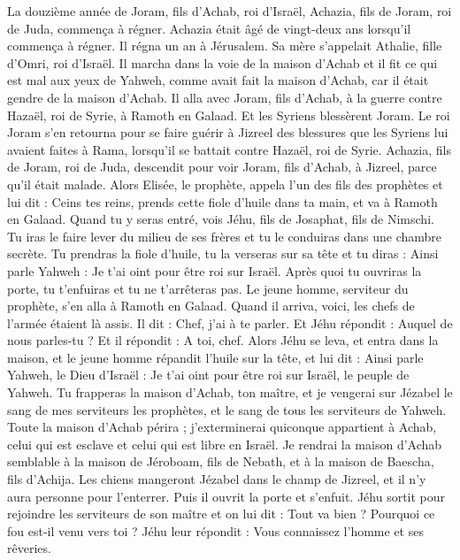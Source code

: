 \begin{multicols}{2}
La douzième année de Joram, fils d'Achab, roi d'Israël, Achazia, fils de Joram, roi de Juda, commença à régner.
Achazia était âgé de vingt-deux ans lorsqu'il commença à régner. Il régna un an à Jérusalem. Sa mère s'appelait Athalie, fille d'Omri, roi d'Israël.
Il marcha dans la voie de la maison d'Achab et il fit ce qui est mal aux yeux de Yahweh, comme avait fait la maison d'Achab, car il était gendre de la maison d'Achab.
Il alla avec Joram, fils d'Achab, à la guerre contre Hazaël, roi de Syrie, à Ramoth en Galaad. Et les Syriens blessèrent Joram.
Le roi Joram s'en retourna pour se faire guérir à Jizreel des blessures que les Syriens lui avaient faites à Rama, lorsqu'il se battait contre Hazaël, roi de Syrie. Achazia, fils de Joram, roi de Juda, descendit pour voir Joram, fils d'Achab, à Jizreel, parce qu'il était malade.
\VerseOne{}Alors Elisée, le prophète, appela l'un des fils des prophètes et lui dit : Ceins tes reins, prends cette fiole d'huile dans ta main, et va à Ramoth en Galaad.
Quand tu y seras entré, vois Jéhu, fils de Josaphat, fils de Nimschi. Tu iras le faire lever du milieu de ses frères et tu le conduiras dans une chambre secrète.
Tu prendras la fiole d'huile, tu la verseras sur sa tête et tu diras : Ainsi parle Yahweh : Je t'ai oint pour être roi sur Israël. Après quoi tu ouvriras la porte, tu t'enfuiras et tu ne t'arrêteras pas.
Le jeune homme, serviteur du prophète, s'en alla à Ramoth en Galaad.
Quand il arriva, voici, les chefs de l'armée étaient là assis. Il dit : Chef, j'ai à te parler. Et Jéhu répondit : Auquel de nous parles-tu ? Et il répondit : A toi, chef.
Alors Jéhu se leva, et entra dans la maison, et le jeune homme répandit l'huile sur la tête, et lui dit : Ainsi parle Yahweh, le Dieu d'Israël : Je t'ai oint pour être roi sur Israël, le peuple de Yahweh.
Tu frapperas la maison d'Achab, ton maître, et je vengerai sur Jézabel le sang de mes serviteurs les prophètes, et le sang de tous les serviteurs de Yahweh.
Toute la maison d'Achab périra ; j'exterminerai quiconque appartient à Achab, celui qui est esclave et celui qui est libre en Israël.
Je rendrai la maison d'Achab semblable à la maison de Jéroboam, fils de Nebath, et à la maison de Baescha, fils d'Achija.
Les chiens mangeront Jézabel dans le champ de Jizreel, et il n'y aura personne pour l'enterrer. Puis il ouvrit la porte et s'enfuit.
Jéhu sortit pour rejoindre les serviteurs de son maître et on lui dit : Tout va bien ? Pourquoi ce fou est-il venu vers toi ? Jéhu leur répondit : Vous connaissez l'homme et ses rêveries.

\end{multicols}
